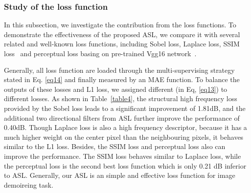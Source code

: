 \documentclass[10pt,twocolumn,letterpaper]{article}
\begin{document}
\subsubsection{Study of the loss function}
\label{loss_study}
\begin{comment}
In this section, we investigate the contribution from the loss functions by validating the performance of MBCNN models trained by L1 loss, L1 loss plus Sobel loss (SL), L1 loss plus ASL, respectively. 
\end{comment}
In this subsection, we investigate the contribution from the loss functions. To demonstrate the effectiveness of the proposed ASL, we compare it with several related and well-known loss functions, including Sobel loss, Laplace loss, SSIM loss~\cite{zhao2016loss} and perceptual loss basing on pre-trained Vgg16 network~\cite{vggloss}.
\begin{comment}
Here, the SL is defined as

where  denotes the classic Sobel filtering. 
Then, the final loss function of L1 loss plus SL can be defined as 

where  in Eq.~\ref{SL} is set to 0.5.
\end{comment}
Generally, all loss function are loaded through the multi-supervising strategy stated in Eq. \ref{eq14} and finally measured by an MAE function. 
To balance the outputs of these losses and L1 loss, we assigned different  (in Eq, \ref{eq13}) to different losses.
As shown in Table~\ref{table4}, the structural high frequency loss provided by the Sobel loss leads to a significant improvement of 1.81dB, and the additional two directional filters from ASL further improve the performance of 0.40dB. 
Though Laplace loss is also a high frequency descriptor, because it has a much higher weight on the center pixel than the neighbouring pixels, it behaves similar to the L1 loss.
Besides, the SSIM loss and perceptual loss also can improve the performance. The SSIM loss behaves similar to Laplace loss, while the perceptual loss is the second best loss function which is only 0.21 dB inferior to ASL. 
Generally, our ASL is an simple and effective loss function for image demoireing task.


\begin{comment}
Moreover, we visualized the demoireing results produced by these three models in Figure~\ref{LOSS_COMP}.
The results clearly show that with more direction information provided by the loss function, a better demoireing model can be learned.
\begin{figure}[t]
	\centering
	\texttt{[image: pic/LOSS\_COMP1.pdf]}
	\caption{Demoireing results produced by MBCNN-nDDT, MBCNN-nLP and MBCNN.}
	\label{LOSS_COMP}
\end{figure}
\end{comment}
\end{document}

